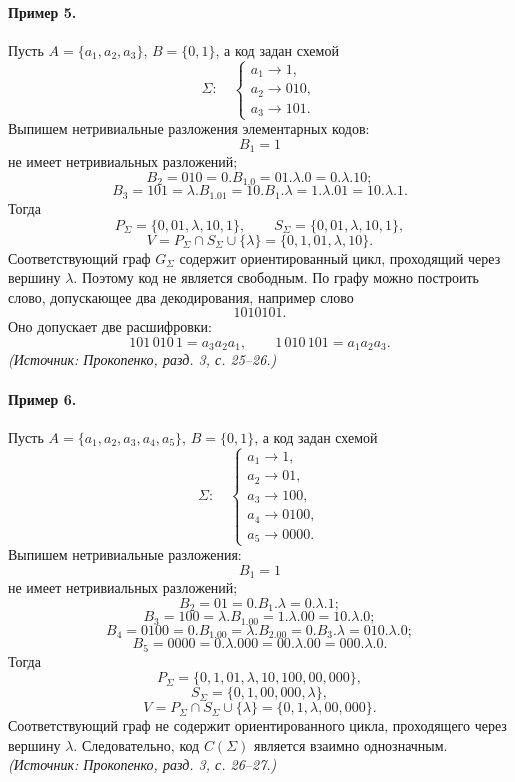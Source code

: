 \documentclass[a4paper,12pt]{article}
\begin{document}
\paragraph{Пример 5.}
Пусть \(A=\{a_1,a_2,a_3\}\), \(B=\{0,1\}\), а код задан схемой
\[
\Sigma:\quad
\begin{cases}
a_1\to 1,\\
a_2\to 010,\\
a_3\to 101.
\end{cases}
\]
Выпишем нетривиальные разложения элементарных кодов:
\[
B_1=1
\]
не имеет нетривиальных разложений;
\[
B_2=010=0.B_1.0=01.\lambda.0=0.\lambda.10;
\]
\[
B_3=101=\lambda.B_1.01=10.B_1.\lambda=1.\lambda.01=10.\lambda.1.
\]
Тогда
\[
P_\Sigma=\{0,01,\lambda,10,1\},\qquad
S_\Sigma=\{0,01,\lambda,10,1\},
\]
\[
V=P_\Sigma\cap S_\Sigma\cup\{\lambda\}=\{0,1,01,\lambda,10\}.
\]
Соответствующий граф \(G_\Sigma\) содержит ориентированный цикл, проходящий через вершину \(\lambda\). Поэтому код не является свободным. По графу можно построить слово, допускающее два декодирования, например слово
\[
1010101.
\]
Оно допускает две расшифровки:
\[
101\,010\,1=a_3a_2a_1,
\qquad
1\,010\,101=a_1a_2a_3.
\]
\textit{(Источник: Прокопенко, разд. 3, с. 25--26.)}

\paragraph{Пример 6.}
Пусть \(A=\{a_1,a_2,a_3,a_4,a_5\}\), \(B=\{0,1\}\), а код задан схемой
\[
\Sigma:\quad
\begin{cases}
a_1\to 1,\\
a_2\to 01,\\
a_3\to 100,\\
a_4\to 0100,\\
a_5\to 0000.
\end{cases}
\]
Выпишем нетривиальные разложения:
\[
B_1=1
\]
не имеет нетривиальных разложений;
\[
B_2=01=0.B_1.\lambda=0.\lambda.1;
\]
\[
B_3=100=\lambda.B_1.00=1.\lambda.00=10.\lambda.0;
\]
\[
B_4=0100=0.B_1.00=\lambda.B_2.00=0.B_3.\lambda=010.\lambda.0;
\]
\[
B_5=0000=0.\lambda.000=00.\lambda.00=000.\lambda.0.
\]
Тогда
\[
P_\Sigma=\{0,1,01,\lambda,10,100,00,000\},
\]
\[
S_\Sigma=\{0,1,00,000,\lambda\},
\]
\[
V=P_\Sigma\cap S_\Sigma\cup\{\lambda\}=\{0,1,\lambda,00,000\}.
\]
Соответствующий граф не содержит ориентированного цикла, проходящего через вершину \(\lambda\). Следовательно, код \(C(\Sigma)\) является взаимно однозначным.
\textit{(Источник: Прокопенко, разд. 3, с. 26--27.)}
\end{document}
